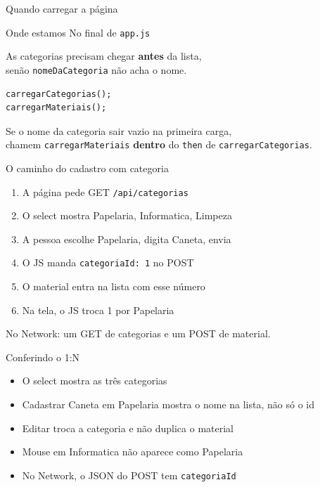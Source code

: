 \documentclass[aspectratio=169,11pt]{beamer}
\newcommand{\onde}[1]{%
  \begin{block}{Onde estamos}
    #1
  \end{block}
}
\begin{document}
\begin{frame}[fragile]{Quando carregar a página}
  \onde{No final de \texttt{app.js}}

  As categorias precisam chegar \textbf{antes} da lista,\\
  senão \texttt{nomeDaCategoria} não acha o nome.

\begin{lstlisting}[basicstyle=\ttfamily\footnotesize]
carregarCategorias();
carregarMateriais();
\end{lstlisting}

  \vspace{0.4em}
  Se o nome da categoria sair vazio na primeira carga,\\
  chamem \texttt{carregarMateriais} \textbf{dentro} do
  \texttt{then} de \texttt{carregarCategorias}.
\end{frame}

\begin{frame}{O caminho do cadastro com categoria}
  \begin{enumerate}
    \item A página pede GET \texttt{/api/categorias}
    \item O select mostra Papelaria, Informatica, Limpeza
    \item A pessoa escolhe Papelaria, digita Caneta, envia
    \item O JS manda \texttt{categoriaId: 1} no POST
    \item O material entra na lista com esse número
    \item Na tela, o JS troca 1 por Papelaria
  \end{enumerate}

  \vspace{0.4em}
  No Network: um GET de categorias e um POST de material.
\end{frame}

\begin{frame}{Conferindo o 1{:}N}
  \begin{itemize}
    \item [ ] O select mostra as três categorias
    \item [ ] Cadastrar Caneta em Papelaria mostra o nome
          na lista, não só o id
    \item [ ] Editar troca a categoria e não duplica o material
    \item [ ] Mouse em Informatica não aparece como Papelaria
    \item [ ] No Network, o JSON do POST tem \texttt{categoriaId}
  \end{itemize}
\end{frame}
\end{document}
